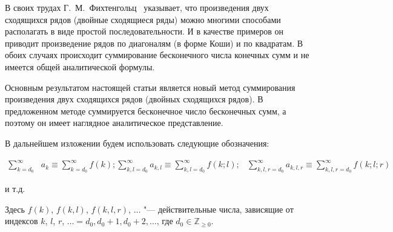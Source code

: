 


\date{21/VII/2013} %









\maketitle




В своих трудах Г.~М.~Фихтенгольц~\cite{korneev:1}  указывает, что произведения двух сходящихся рядов (двойные сходящиеся ряды) можно многими способами располагать в виде простой последовательности. И в качестве примеров он приводит произведение рядов по диагоналям (в форме Коши) и по квадратам. В обоих случаях происходит суммирование бесконечного числа конечных сумм и не имеется общей аналитической формулы.



Основным результатом настоящей статьи является новый метод суммирования произведения двух сходящихся рядов (двойных сходящихся рядов). В предложенном методе суммируется бесконечное число бесконечных сумм, а поэтому он имеет наглядное аналитическое представление.





В дальнейшем изложении будем использовать следующие обозначения:

\begin{align*}

\sum_{k=d_0}^\infty &a_k\equiv \sum_{k=d_0}^\infty f(k); 

\sum_{k,l=d_0}^\infty a_{k,l}\equiv \sum_{k,l=d_0}^\infty f(k;l);   

&\sum_{k,l,r=d_0}^\infty a_{k,l,r}\equiv \sum_{k,l,r=d_0}^\infty f(k;l;r)

\end{align*}

и т.д.

Здесь $f(k)$, $f(k,l)$, $f(k,l,r)$, $\ldots$ "--- действительные числа, зависящие от индексов $k$, $l$, $r$, $\ldots=d_0, d_0+1, d_0+2, \ldots$, где $d_0\in\mathbb{Z}_{\ge 0}$.



